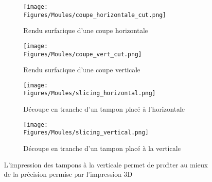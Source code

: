 \documentclass[\main/main.tex]{subfiles}
\begin{document}
\begin{figure}[htbp]
    \centering
    \begin{subfigure}[b]{0.45\textwidth}
       \centering \caption{
            \label{fig:coupe:model:horizontal}
            Rendu surfacique \newline d'une coupe horizontale
            }
       \centering \texttt{[image: \\Figures/Moules/coupe\_horizontale\_cut.png]}
    \end{subfigure}
    \begin{subfigure}[b]{0.45\textwidth}
       \centering \caption{
            \label{fig:coupe:model:vertical}
            Rendu surfacique \newline  d'une coupe verticale
            }
       \centering \texttt{[image: \\Figures/Moules/coupe\_vert\_cut.png]}
    \end{subfigure}
    \begin{subfigure}[b]{0.45\textwidth}
       \centering \caption{
            \label{fig:coupe:slicing:horizontal}
            Découpe en tranche d'un \newline tampon placé à l'horizontale
            }
       \centering \texttt{[image: \\Figures/Moules/slicing\_horizontal.png]}
    \end{subfigure}
    \begin{subfigure}[b]{0.45\textwidth}
       \centering \caption{
            \label{fig:coupe:slicing:vertical}
            Découpe en tranche d'un \newline tampon placé à la verticale
            }
       \centering \texttt{[image: \\Figures/Moules/slicing\_vertical.png]}
    \end{subfigure}
    \caption{
        \label{fig:coupe}
        L'impression des tampons à la verticale permet de profiter au mieux de la précision permise par l'impression 3D
    }
    
\end{figure}
\end{document}
